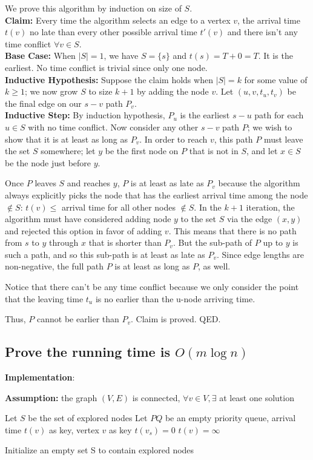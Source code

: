 \documentclass{article}
\begin{document}
We prove this algorithm by induction on size of $S$.\\
\textbf{Claim:} Every time the algorithm selects an edge to a vertex $v$, the arrival time $t(v)$ no late than every other possible arrival time $t'(v)$ and there isn't any time conflict $\forall v\in S$.\\
\textbf{Base Case:} When $|S|=1$, we have $S=\{s\}$ and $t(s) = T+0 = T$. It is the earliest. No time conflict is trivial since only one node.\\
\textbf{Inductive Hypothesis:} Suppose the claim holds when $|S|=k$ for some value of $k \geq 1$; we now grow $S$ to size $k + 1$ by adding the node $v$. Let $(u, v, t_u, t_v)$ be the final edge on our $s-v$ path $P_v$.\\
\textbf{Inductive Step:} By induction hypothesis, $P_u$ is the earliest $s-u$ path for each $u\in S$ with no time conflict. Now consider any other $s-v$ path $P$; we wish to show that it is at least as long as $P_v$. In order to reach $v$, this path $P$ must leave the set $S$ somewhere; let $y$ be the first node on $P$ that is not in $S$, and let $x \in S$ be the node just before $y$.

Once $P$ leaves $S$ and reaches $y$, $P$ is at least as late as $P_v$ because the algorithm always explicitly picks the node that has the earliest arrival time among the node $\not\in S$: $t(v) \leq$ arrival time for all other nodes $\not\in S$. In the $k+1$ iteration, the algorithm must have considered adding node $y$ to the set $S$ via the edge $(x, y)$ and rejected this option in favor of adding $v$. This means that there is no path from $s$ to $y$ through $x$ that is shorter than $P_v$. But the sub-path of $P$ up to $y$ is such a path, and so this sub-path is at least as late as $P_v$. Since edge lengths are non-negative, the full path $P$ is at least as long as $P$, as well.

Notice that there can't be any time conflict because we only consider the point that the leaving time $t_u$ is no earlier than the u-node arriving time.

Thus, $P$ cannot be earlier than $P_v$. Claim is proved. QED.

\subsection{Prove the running time is $O(m\log{n})$}

\textbf{Implementation}:
\begin{algorithm}
\textbf{Assumption:} the graph $(V,E)$ is connected, $\forall v \in V, \exists$ at least one solution
    \begin{algorithmic}
    \State Let $S$ be the set of explored nodes
    \State Let $PQ$ be an empty priority queue, arrival time $t(v)$ as key, vertex $v$ as key
            \State $t(v_s) = 0$
        \Else
            \State $t(v) = \infty$
        \Endif
    \EndFor

    \State Initialize an empty set S to contain explored nodes
    \While{}
    \EndWhile
    \end{algorithmic}
    \end{algorithm}
\end{document}
